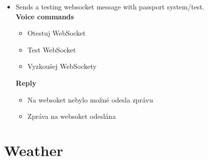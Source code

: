 \begin{itemize}
\begin{itemize}
    \end{itemize}
    \item Sends a testing websocket message with passport system/test.\\
    \textbf{Voice commands}
    \begin{itemize}
        \item Otestuj WebSocket
        \item Test WebSocket
        \item Vyzkoušej WebSockety
    \end{itemize}
    \textbf{Reply}
    \begin{itemize}
        \item Na websoket nebylo možné odesla zprávu
        \item Zpráva na websoket odeslána
    \end{itemize}
\end{itemize}

\section{Weather}\label{section:app_weather}


